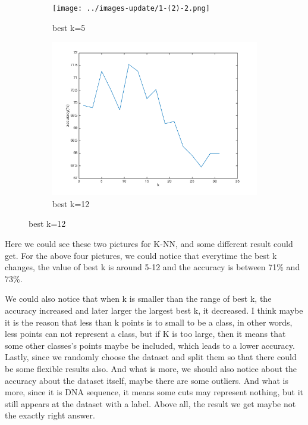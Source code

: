 \documentclass[]{article}
\begin{document}
\begin{figure}[p]
	
	\begin{subfigure}{.5\textwidth}
		\centering
		\texttt{[image: ../images-update/1-(2)-2.png]}
		\caption{best k=5}
		\label{fig:sub1}
	\end{subfigure}
	
	\begin{subfigure}{.5\textwidth}
		\centering
		\includegraphics[width=1\linewidth]{../images-update/1-(2)-3.png}
		\caption{best k=12}
		\label{fig:sub1}
	\end{subfigure}
	
\end{figure}

Here we could see these two pictures for K-NN, and some different result could get. 
For the above four pictures, we could notice that everytime the best k changes, the value of best k is around 5-12 and the accuracy is between 71\% and 73\%.

We could also notice that when k is smaller than the range of best k, the accuracy increased and later larger the largest best k, it decreased. I think maybe it is the reason that less than k points is to small to be a class, in other words, less points can not represent a class, but if K is too large, then it means that some other classes's points maybe be included, which leads to a lower accuracy. Lastly, since we randomly choose the dataset and split them so that there could be some flexible results also.
And what is more, we should also notice about the accuracy about the dataset itself, maybe there are some outliers. And what is more, since it is DNA sequence, it means some cuts may represent nothing, but it still appears at the dataset with a label. Above all, the result we get maybe not the exactly right answer.
\end{document}
